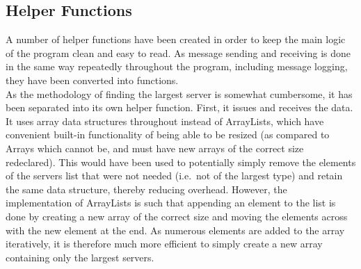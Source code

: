 \documentclass[a4paper]{article} %
\begin{document}
\subsection{Helper Functions}
A number of helper functions have been created in order to keep the main logic of the program clean and easy to read. As message sending and receiving is done in the same way repeatedly throughout the program, including 
message logging, they have been converted into functions.\\
As the methodology of finding the largest server is somewhat cumbersome, it has been separated into its own helper function. First, it issues and receives the data. It uses array data structures throughout instead of 
ArrayLists, which have convenient built-in functionality of being able to be resized (as compared to Arrays which cannot be, and must have new arrays of the correct size redeclared). This would have been used to potentially 
simply remove the elements of the servers list that were not needed (i.e.\ not of the largest type) and retain the same data structure, thereby reducing overhead. However, the implementation of ArrayLists is such that 
appending an element to the list is done by creating a new array of the correct size and moving the elements across with the new element at the end. As numerous elements are added to the array iteratively, it is therefore 
much more efficient to simply create a new array containing only the largest servers.





\end{document}
